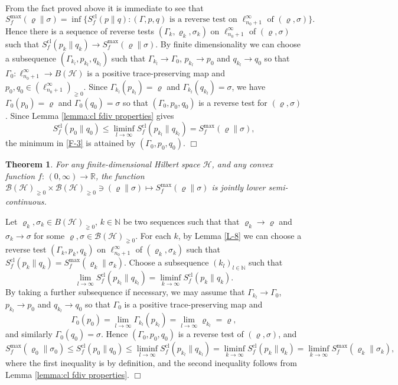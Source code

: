 \documentclass[unsortedaddress,superscriptaddress,pra,notitlepage]{revtex4}
\newtheorem{theorem}[definition]{Theorem}
\newenvironment{proof}[1][Proof]{\begin{trivlist}
\item[\hskip \labelsep {\bfseries #1}]}{\hfill$\Box$\end{trivlist}}
\def\B{{\mathcal B}}
\def\bN{\mathbb{N}}
\def\bR{\mathbb{R}}
\def\rho{\varrho}
\def\hil{{\mathcal H}}
\def\pne{_{\gneq 0}}
\def\cl{\mathrm{cl}}
\def\cH{\mathcal{H}}
\def\cl{\mathrm{cl}}
\begin{document}
\begin{proof}
From the fact proved above it is immediate to see that
\[
S_f^{\max}(\rho\|\sigma)=\inf\bigl\{S_f^\cl(p\|q):
\mbox{$(\Gamma,p,q)$ is a reverse test on $\ell_{n_0+1}^\infty$ of $(\rho,\sigma)$}\bigr\}.
\]
Hence there is a sequence of reverse tests $(\Gamma_k,\rho_k,\sigma_k)$ on
$\ell_{n_0+1}^\infty$ of $(\rho,\sigma)$ such that $S_f^\cl(p_k\|q_k)\to S_f^{\max}(\rho\|\sigma)$.
By finite dimensionality we can choose a subsequence $(\Gamma_{k_l},p_{k_l},q_{k_l})$ such
that $\Gamma_{k_l}\to\Gamma_0$, $p_{k_l}\to p_0$ and $q_{k_l}\to q_0$ so that
$\Gamma_0:\ell_{n_0+1}^\infty\to B(\cH)$ is a positive trace-preserving map and
$p_0,q_0\in(\ell_{n_0+1}^\infty)\pne$. Since $\Gamma_{k_l}(p_{k_l})=\rho$ and
$\Gamma_{k_l}(q_{k_l})=\sigma$, we have $\Gamma_0(p_0)=\rho$ and
$\Gamma_0(q_0)=\sigma$ so that $(\Gamma_0,p_0,q_0)$ is a reverse test for $(\rho,\sigma)$.
Since Lemma \ref{lemma:cl fdiv properties} gives
\[
S_f^\cl(p_0\|q_0)\le\liminf_{l\to\infty}S_f^\cl(p_{k_l}\|q_{k_l})
=S_f^{\max}(\rho\|\sigma),
\]
the minimum in \eqref{F-3} is attained by $(\Gamma_0,p_0,q_0)$.
\end{proof}

\begin{theorem}\label{thm:maxfdiv lsc}
For any finite-dimensional Hilbert space $\hil$, and any 
convex function $f:\,(0,\infty)\to \bR$, 
the function $\B(\hil)\pne\times\B(\hil)\pne\ni(\rho\|\sigma)\mapsto
S_f^{\max}(\rho\|\sigma)$ is jointly lower
semi-continuous.
\end{theorem}

\begin{proof}
Let $\rho_k,\sigma_k\in B(\cH)\pne$, $k\in\bN$ be 
two sequences such that
that $\rho_k\to\rho$ and
$\sigma_k\to\sigma$ for some $\rho,\sigma\in\B(\hil)\pne$. For each $k$, by Lemma \ref{L-8} we can choose a reverse test
$(\Gamma_k,p_k,q_k)$ on $\ell_{n_0+1}^\infty$ of $(\rho_k,\sigma_k)$ such that
$S_f^\cl(p_k\|q_k)=S_f^{\max}(\rho_k\|\sigma_k)$. Choose a subsequence $(k_l)_{l\in\bN}$
such that
\[
\lim_{l\to\infty}S_f^\cl(p_{k_l}\|q_{k_l})=\liminf_{k\to\infty}S_f^\cl(p_k\|q_k).
\]
By taking a further subsequence if necessary, we may assume that $\Gamma_{k_l}\to\Gamma_0$,
$p_{k_l}\to p_0$ and $q_{k_l}\to q_0$ so that $\Gamma_0$ is a positive trace-preserving map
and
\[
\Gamma_0(p_0)=\lim_{l\to\infty}\Gamma_{k_l}(p_{k_l})=\lim_{l\to\infty}\rho_{k_l}=\rho,
\]
and similarly $\Gamma_0(q_0)=\sigma$. Hence $(\Gamma_0,p_0,q_0)$ is a reverse test of
$(\rho,\sigma)$, and 
\[
S_f^{\max}(\rho_0\|\sigma_0)\le
S_f^\cl(p_0\|q_0)\le\liminf_{l\to\infty}S_f^\cl(p_{k_l}\|q_{k_l})
=\liminf_{k\to\infty}S_f^\cl(p_k\|q_k)=\liminf_{k\to\infty}S_f^{\max}(\rho_k\|\sigma_k),
\]
where the first inequality 
is by definition, and the second inequality 
follows from Lemma \ref{lemma:cl fdiv properties}.
\end{proof}
\end{document}
